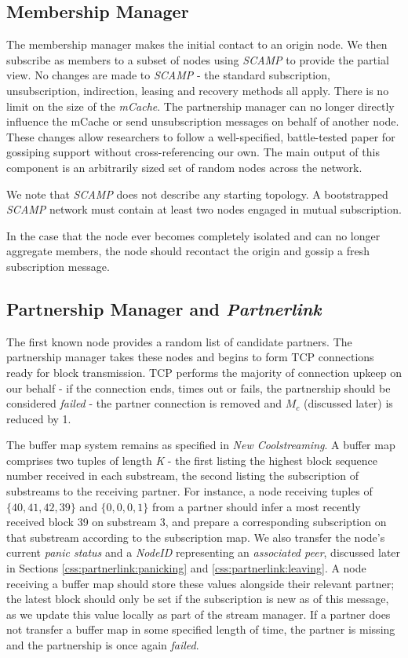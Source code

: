 \documentclass[12pt,a4paper]{article}
\begin{document}
\subsection{Membership Manager} \label{css:membership}
The membership manager makes the initial contact to an origin node. We then subscribe as members to a subset of nodes using \textit{SCAMP} to provide the partial view. No changes are made to \textit{SCAMP} - the standard subscription, unsubscription, indirection, leasing and recovery methods all apply. There is no limit on the size of the \textit{mCache}. The partnership manager can no longer directly influence the mCache or send unsubscription messages on behalf of another node. These changes allow researchers to follow a well-specified, battle-tested paper for gossiping support without cross-referencing our own. The main output of this component is an arbitrarily sized set of random nodes across the network.

We note that \textit{SCAMP} does not describe any starting topology. A bootstrapped \textit{SCAMP} network must contain at least two nodes engaged in mutual subscription.

In the case that the node ever becomes completely isolated and can no longer aggregate members, the node should recontact the origin and gossip a fresh subscription message.

\subsection{Partnership Manager and \textit{Partnerlink}} \label{css:partnerlink}
The first known node provides a random list of candidate partners. The partnership manager takes these nodes and begins to form TCP connections ready for block transmission. TCP performs the majority of connection upkeep on our behalf - if the connection ends, times out or fails, the partnership should be considered \textit{failed} - the partner connection is removed and \(M_c\) (discussed later) is reduced by 1.

The buffer map system remains as specified in \textit{New Coolstreaming}. A buffer map comprises two tuples of length \textit{K} - the first listing the highest block sequence number received in each substream, the second listing the subscription of substreams to the receiving partner. For instance, a node receiving tuples of \(\{40, 41, 42, 39\}\) and \(\{0, 0, 0, 1\}\) from a partner should infer a most recently received block 39 on substream 3, and prepare a corresponding subscription on that substream according to the subscription map. We also transfer the node's current \textit{panic status} and a \textit{NodeID} representing an \textit{associated peer}, discussed later in Sections \ref{css:partnerlink:panicking} and \ref{css:partnerlink:leaving}. A node receiving a buffer map should store these values alongside their relevant partner; the latest block should only be set if the subscription is new as of this message, as we update this value locally as part of the stream manager. If a partner does not transfer a buffer map in some specified length of time, the partner is missing and the partnership is once again \textit{failed}.
\end{document}
